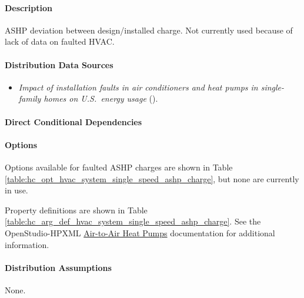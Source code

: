 \paragraph{Description}
% 
ASHP deviation between design/installed charge. Not currently used because of lack of data on faulted HVAC. 

\paragraph{Distribution Data Sources}
% 
\begin{itemize}
\item 

 \textit{Impact of installation faults in air conditioners and heat pumps in single-family homes on U.S.~energy usage} (\cite{Winkler2020}). 
\end{itemize}

\paragraph{Direct Conditional Dependencies}


\paragraph{Options}
Options available for faulted ASHP charges are shown in Table \ref{table:hc_opt_hvac_system_single_speed_ashp_charge}, but none are currently in use.



Property definitions are shown in Table \ref{table:hc_arg_def_hvac_system_single_speed_ashp_charge}. See the OpenStudio-HPXML \href{https://openstudio-hpxml.readthedocs.io/en/v1.10.0/workflow_inputs.html#air-to-air-heat-pump}{Air-to-Air Heat Pumps} documentation for additional information.



\paragraph{Distribution Assumptions}
% 
None.
